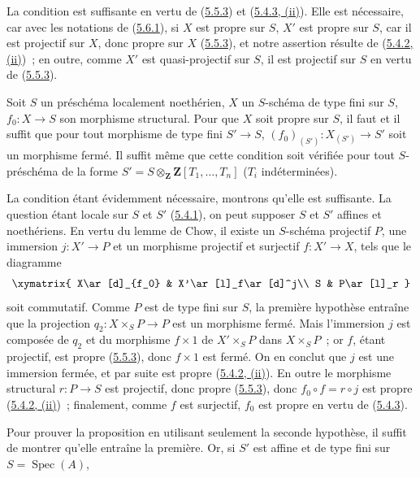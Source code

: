 La condition est suffisante en vertu de (\hyperref[II.5.5.3-fr]{5.5.3}) et
(\hyperref[II.5.4.3-fr]{5.4.3, (ii)}). Elle est nécessaire, car avec les
notations de (\hyperref[II.5.6.1-fr]{5.6.1}), si $X$ est propre sur $S$, $X'$
est propre sur $S$, car il est projectif sur $X$, donc propre sur $X$
(\hyperref[II.5.5.3-fr]{5.5.3}), et notre assertion résulte de
(\hyperref[II.5.4.2-fr]{5.4.2, (ii)})~; en outre, comme $X'$ est
quasi-projectif sur $S$, il est projectif sur $S$ en vertu de
(\hyperref[II.5.5.3-fr]{5.5.3}).

\begin{corollary}[5.6.3]
\label{II.5.6.3-fr}
Soit $S$ un préschéma localement noethérien, $X$ un $S$-schéma de type fini
sur $S$, $f_0:X\to S$ son morphisme structural. Pour que $X$ soit propre sur
$S$, il faut et il suffit que pour tout morphisme de type fini $S'\to S$,
$(f_0)_{(S')}:X_{(S')}\to S'$ soit un morphisme fermé. Il suffit même que
cette condition soit vérifiée pour tout $S$-préschéma de la forme
$S'=S\otimes_{\mathbf Z}\mathbf Z[T_1,\ldots,T_n]$ ($T_i$ indéterminées).
\end{corollary}

La condition étant évidemment nécessaire, montrons qu'elle est suffisante.
La question étant locale sur $S$ et $S'$ (\hyperref[II.5.4.1-fr]{5.4.1}), on
peut supposer $S$ et $S'$ affines et noethériens. En vertu du lemme de Chow,
il existe un $S$-schéma projectif $P$, une immersion $j:X'\to P$ et un
morphisme projectif et surjectif $f:X'\to X$, tels que le diagramme
\[
\xymatrix{
X\ar[d]_{f_0} & X'\ar[l]_f\ar[d]^j\\
S & P\ar[l]_r
}
\]
soit commutatif. Comme $P$ est de type fini sur $S$, la première hypothèse
entraîne que la projection $q_2:X\times_SP\to P$ est un morphisme fermé. Mais
l'immersion $j$ est composée de $q_2$ et du morphisme $f\times1$ de
$X'\times_SP$ dans $X\times_SP$~; or $f$, étant projectif, est propre
(\hyperref[II.5.5.3-fr]{5.5.3}), donc $f\times1$ est fermé. On en conclut que
$j$ est une immersion fermée, et par suite est propre
(\hyperref[II.5.4.2-fr]{5.4.2, (ii)}). En outre le morphisme structural
$r:P\to S$ est projectif, donc propre (\hyperref[II.5.5.3-fr]{5.5.3}), donc
$f_0\circ f=r\circ j$ est propre
(\hyperref[II.5.4.2-fr]{5.4.2, (ii)})~; finalement, comme $f$ est surjectif,
$f_0$ est propre en vertu de (\hyperref[II.5.4.3-fr]{5.4.3}).

Pour prouver la proposition en utilisant seulement la seconde hypothèse, il
suffit de montrer qu'elle entraîne la première. Or, si $S'$ est affine et de
type fini sur $S=\operatorname{Spec}(A)$,

